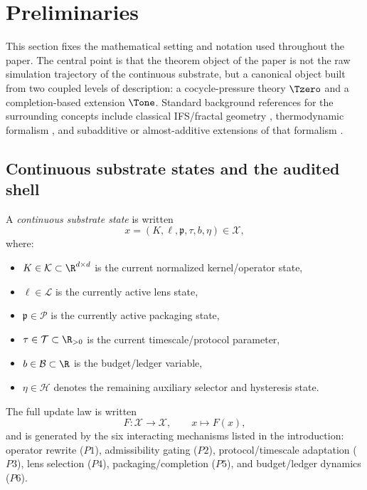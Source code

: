 \section{Preliminaries}\label{sec:preliminaries}

This section fixes the mathematical setting and notation used throughout the paper. The central point is that the theorem object of the paper is not the raw simulation trajectory of the continuous substrate, but a canonical object built from two coupled levels of description: a cocycle-pressure theory \(\Tzero\) and a completion-based extension \(\Tone\). Standard background references for the surrounding concepts include classical IFS/fractal geometry \cite{Hutchinson1981Fractals,FalconerFractalGeometry,MauldinUrbanskiGDMS,Moran1946AdditiveFunctions}, thermodynamic formalism \cite{Ruelle1978ThermodynamicFormalism,WaltersErgodic1982,BarreiraNonadditiveTF}, and subadditive or almost-additive extensions of that formalism \cite{CaoFengHuang2008SubAdditive,Mummert2006AlmostAdditive}.

\subsection{Continuous substrate states and the audited shell}

A \emph{continuous substrate state} is written
\[
x=(K,\ell,\mathfrak{p},\tau,b,\eta)\in \mathcal{X},
\]
where:
\begin{itemize}
    \item \(K\in\mathcal{K}\subset \R^{d\times d}\) is the current normalized kernel/operator state,
    \item \(\ell\in\mathcal{L}\) is the currently active lens state,
    \item \(\mathfrak{p}\in\mathcal{P}\) is the currently active packaging state,
    \item \(\tau\in\mathcal{T}\subset \R_{>0}\) is the current timescale/protocol parameter,
    \item \(b\in\mathcal{B}\subset \R\) is the budget/ledger variable,
    \item \(\eta\in\mathcal{H}\) denotes the remaining auxiliary selector and hysteresis state.
\end{itemize}
The full update law is written
\[
F:\mathcal{X}\to\mathcal{X},\qquad x\mapsto F(x),
\]
and is generated by the six interacting mechanisms listed in the introduction:
operator rewrite (\(P1\)), admissibility gating (\(P2\)), protocol/timescale adaptation (\(P3\)), lens selection (\(P4\)), packaging/completion (\(P5\)), and budget/ledger dynamics (\(P6\)).

